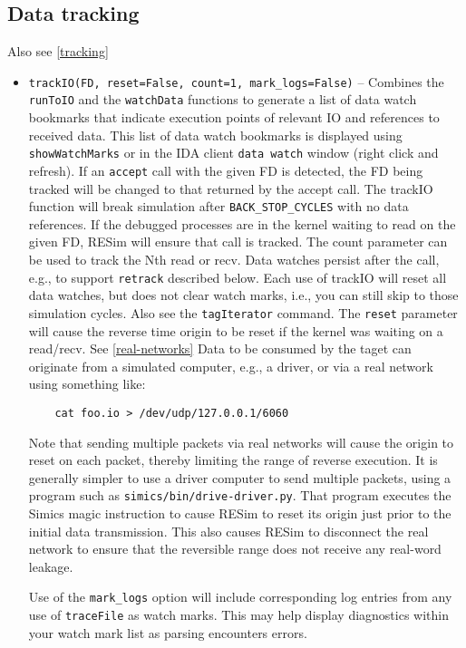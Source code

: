 \documentclass[titlepage]{article}
\begin{document}
\subsection{Data tracking}
Also see \ref{tracking}
\begin{itemize}

\item {\tt trackIO(FD, reset=False, count=1, mark\_logs=False)} -- Combines the {\tt runToIO} and the {\tt watchData} functions to generate a list of data watch bookmarks that indicate execution
points of relevant IO and references to received data.  This list of data watch bookmarks is displayed using {\tt showWatchMarks} or in the IDA client {\tt data watch} window (right click and refresh).
If an {\tt accept} call with the given FD is detected, the FD being tracked will be changed to that returned by the accept call.
The trackIO function will break simulation after {\tt BACK\_STOP\_CYCLES} with no data references. If the debugged processes are in the kernel waiting to read on the given
FD, RESim will ensure that call is tracked.  The count parameter can be used to track the Nth read or recv.   Data watches persist after the
call, e.g., to support {\tt retrack} described below.  Each use of trackIO will reset all data watches, but does not clear watch marks, i.e., you can still skip to those simulation cycles.  Also see 
the {\tt tagIterator} command.  The {\tt reset} parameter will cause the reverse time origin to be reset if the kernel was waiting on a read/recv. See \ref{real-networks}  Data to be consumed by the taget can originate from a simulated computer, e.g., a driver, or via a real network using something like:
\begin{verbatim}
    cat foo.io > /dev/udp/127.0.0.1/6060 
\end{verbatim}
\noindent Note that sending multiple packets via real networks will cause the origin to reset on each packet, thereby limiting the range of reverse execution.  It is generally simpler
to use a driver computer to send multiple packets, using a program such as {\tt simics/bin/drive-driver.py}.  That program executes the Simics magic instruction to cause RESim to reset
its origin just prior to the initial data transmission.  This also causes RESim to disconnect the real network to ensure that the reversible range does not receive any real-word leakage.

Use of the {\tt mark\_logs} option will include corresponding log entries from any use of {\tt traceFile} as watch marks.  This may help display diagnostics
within your watch mark list as parsing encounters errors.


\end{itemize}
\end{document}
